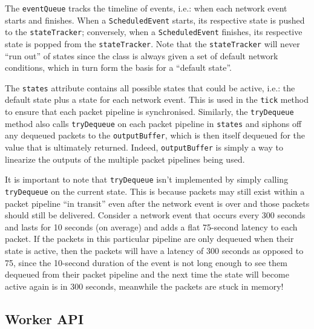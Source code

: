 The \texttt{eventQueue} tracks the timeline of events, i.e.: when each network event starts and finishes. When a
\texttt{ScheduledEvent} starts, its respective state is pushed to the \texttt{stateTracker}; conversely, when a
\texttt{ScheduledEvent} finishes, its respective state is popped from the \texttt{stateTracker}. Note that the
\texttt{stateTracker} will never ``run out'' of states since the class is always given a set of default network
conditions, which in turn form the basis for a ``default state''.

The \texttt{states} attribute contains all possible states that could be active, i.e.: the default state plus a state
for each network event. This is used in the \texttt{tick} method to ensure that each packet pipeline is synchronised.
Similarly, the \texttt{tryDequeue} method also calls \texttt{tryDequeue} on each packet pipeline in \texttt{states}
and siphons off any dequeued packets to the \texttt{outputBuffer}, which is then itself dequeued for the value
that is ultimately returned. Indeed, \texttt{outputBuffer} is simply a way to linearize the outputs of the multiple
packet pipelines being used.

It is important to note that \texttt{tryDequeue} isn't implemented by simply calling \texttt{tryDequeue} on the current
state. This is because packets may still exist within a packet pipeline ``in transit'' even after the network event is
over and those packets should still be delivered. Consider a network event that occurs every 300 seconds and lasts
for 10 seconds (on average) and adds a flat 75-second latency to each packet. If the packets in this particular
pipeline are only dequeued when their state is active, then the packets will have a latency of 300 seconds as opposed
to 75, since the 10-second duration of the event is not long enough to see them dequeued from their packet pipeline
and the next time the state will become active again is in 300 seconds, meanwhile the packets are stuck in memory!

\subsection{Worker API}


